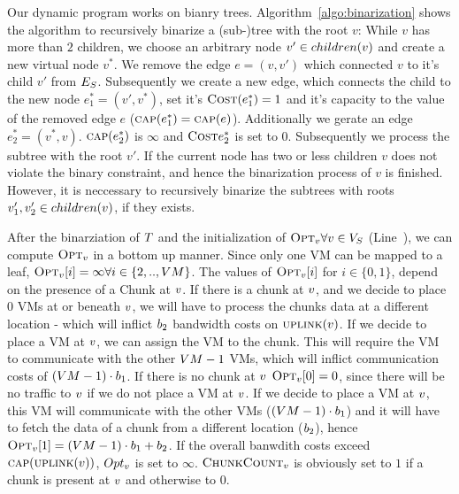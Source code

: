 Our dynamic program works on bianry trees. Algorithm~\ref{algo:binarization} 
shows the algorithm to recursively binarize a (sub-)tree with the root $v$:
While $v$ has more than 
$2$ children, we choose an arbitrary node $v' \in children(v)$ 
and create a new virtual node $v^*$. We remove the edge $e = (v, v')$ which 
connected $v$ to it's child $v'$ from $E_S$. Subsequently we create 
a new edge, which connects the 
child to the new node $e^*_1 = (v', v^*)$, set it's 
$\textsc{Cost}(e^*_1) = 1$ and it's capacity to the value of the removed edge $e$ 
($\textsc{cap}(e^*_1) = \textsc{cap}(e)$). Additionally we gerate an edge $e^*_2 = 
(v^*, v)$. $\textsc{cap}(e^*_2)$ is $\infty$ and $\textsc{Cost}{e^*_2}$ is set to $0$.
Subsequently we process the subtree with the root $v'$. If the current node has 
two or less children $v$ does not violate the binary constraint, and hence the 
binarization process of $v$ is finished. However, it is neccessary to 
recursively binarize the subtrees with roots $v'_1, v'_2 \in children(v)$, if 
they exists.

After the binarziation of $T$ and the initialization of 
$\textsc{Opt}_{v} \forall v \in V_S$ 
(Line~), we can compute $\textsc{Opt}_{v}$ in a bottom up 
manner. Since only one VM can be mapped to a leaf, $\textsc{Opt}_{v}[i] = 
\infty \forall i \in \{2,..,VM\}$. The values of 
$\textsc{Opt}_{v}[i]$ for $i \in \{0,1\}$, depend on the presence of a Chunk 
at $v$. If there is a chunk at $v$, and we decide to 
place $0$ VMs at or beneath $v$, we will have to process the chunks 
data at a different location - which will inflict $b_2$ bandwidth costs 
on $\textsc{uplink}(v)$. If we decide to place a VM at $v$, 
we can assign the VM to the chunk. This will require the VM to communicate with 
the other $VM -1$ VMs, which will inflict communication costs of $(VM -1) 
\cdot b_1$. If there is no chunk at $v$ 
$\textsc{Opt}_{v}[0] = 0$, since there will be no traffic to 
$v$ if we do not place a VM at $v$. If we decide to 
place a VM at $v$, this VM will communicate with the other VMs 
($(VM -1) \cdot b_1$) and it will have to fetch the data of a chunk from 
a different location ($b_2$), hence $\textsc{Opt}_{v}[1] = (VM -1 
)\cdot b_1  + b_2$. If the overall banwdith costs exceed 
$\textsc{cap}(\textsc{uplink}(v))$, $Opt_{v}$ is set to $\infty$.
$\textsc{ChunkCount}_{v}$ is obviously set to 
$1$ if a 
chunk is present at $v$ and otherwise to $0$.

